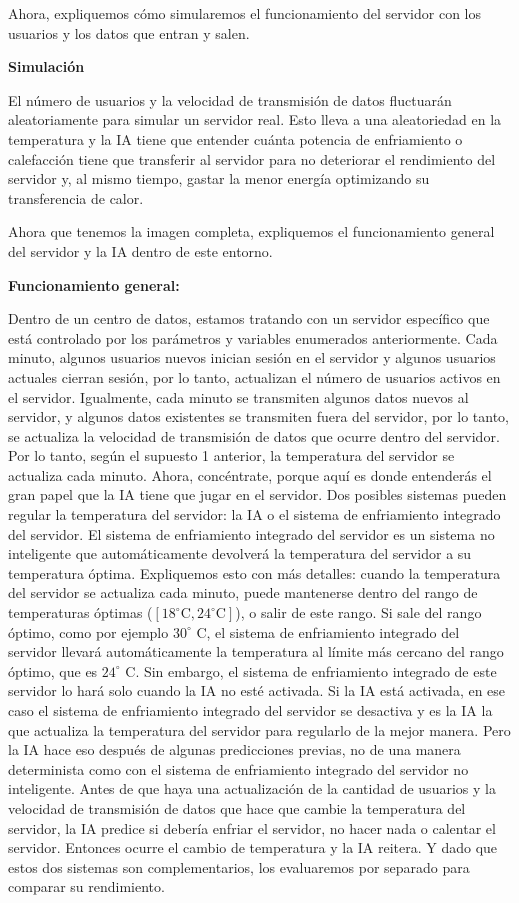 \documentclass[]{book}
\begin{document}
Ahora, expliquemos cómo simularemos el funcionamiento del servidor con los usuarios y los datos que entran y salen.

\textbf{Simulación}

El número de usuarios y la velocidad de transmisión de datos fluctuarán aleatoriamente para simular un servidor real. Esto lleva a una aleatoriedad en la temperatura y la IA tiene que entender cuánta potencia de enfriamiento o calefacción tiene que transferir al servidor para no deteriorar el rendimiento del servidor y, al mismo tiempo, gastar la menor energía optimizando su transferencia de calor.

Ahora que tenemos la imagen completa, expliquemos el funcionamiento general del servidor y la IA dentro de este entorno.

\textbf{Funcionamiento general:}

Dentro de un centro de datos, estamos tratando con un servidor específico que está controlado por los parámetros y variables enumerados anteriormente. Cada minuto, algunos usuarios nuevos inician sesión en el servidor y algunos usuarios actuales cierran sesión, por lo tanto, actualizan el número de usuarios activos en el servidor. Igualmente, cada minuto se transmiten algunos datos nuevos al servidor, y algunos datos existentes se transmiten fuera del servidor, por lo tanto, se actualiza la velocidad de transmisión de datos que ocurre dentro del servidor. Por lo tanto, según el supuesto 1 anterior, la temperatura del servidor se actualiza cada minuto. Ahora, concéntrate, porque aquí es donde entenderás el gran papel que la IA tiene que jugar en el servidor. Dos posibles sistemas pueden regular la temperatura del servidor: la IA o el sistema de enfriamiento integrado del servidor. El sistema de enfriamiento integrado del servidor es un sistema no inteligente que automáticamente devolverá la temperatura del servidor a su temperatura óptima. Expliquemos esto con más detalles: cuando la temperatura del servidor se actualiza cada minuto, puede mantenerse dentro del rango de temperaturas óptimas (\([18^{\circ} \textrm{C}, 24^{\circ} \textrm{C}]\)), o salir de este rango. Si sale del rango óptimo, como por ejemplo \(30^{\circ}\) C, el sistema de enfriamiento integrado del servidor llevará automáticamente la temperatura al límite más cercano del rango óptimo, que es \(24^{\circ}\) C. Sin embargo, el sistema de enfriamiento integrado de este servidor lo hará solo cuando la IA no esté activada. Si la IA está activada, en ese caso el sistema de enfriamiento integrado del servidor se desactiva y es la IA la que actualiza la temperatura del servidor para regularlo de la mejor manera. Pero la IA hace eso después de algunas predicciones previas, no de una manera determinista como con el sistema de enfriamiento integrado del servidor no inteligente. Antes de que haya una actualización de la cantidad de usuarios y la velocidad de transmisión de datos que hace que cambie la temperatura del servidor, la IA predice si debería enfriar el servidor, no hacer nada o calentar el servidor. Entonces ocurre el cambio de temperatura y la IA reitera. Y dado que estos dos sistemas son complementarios, los evaluaremos por separado para comparar su rendimiento.
\end{document}
